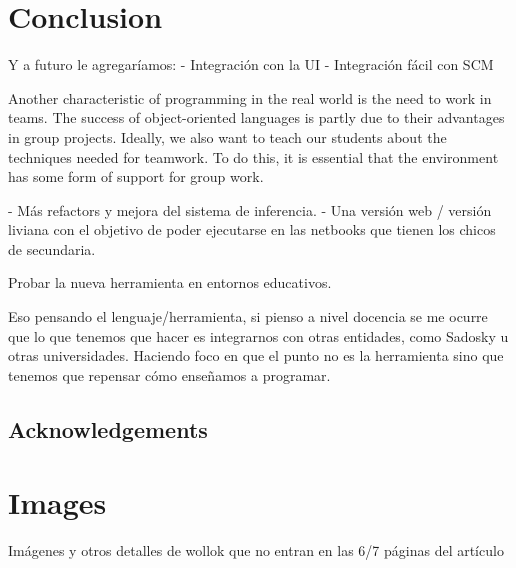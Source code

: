 \documentclass{article}
\begin{document}

\section{Conclusion}
\label{sec:conclusion}



Y a futuro le agregaríamos:
- Integración con la UI
- Integración fácil con SCM

Another characteristic of programming in the real world is the need to work in
teams. The success of object-oriented languages is partly due to their advantages in
group projects. Ideally, we also want to teach our students about the techniques
needed for teamwork. To do this, it is essential that the environment has some form
of support for group work. \cite{kolling_problem_1999}

- Más refactors y mejora del sistema de inferencia.
- Una versión web / versión liviana con el objetivo de poder ejecutarse en las netbooks que tienen los chicos de secundaria.

Probar la nueva herramienta en entornos educativos.

Eso pensando el lenguaje/herramienta, si pienso a nivel docencia se me ocurre que lo que tenemos que hacer es integrarnos con otras entidades, como Sadosky u otras universidades.
Haciendo foco en que el punto no es la herramienta sino que tenemos que repensar cómo enseñamos a programar.

\subsection*{Acknowledgements} 

% 
% 

% 




\appendix
\section{Images}
Imágenes y otros detalles de wollok que no entran en las 6/7 páginas del artículo
\end{document}
